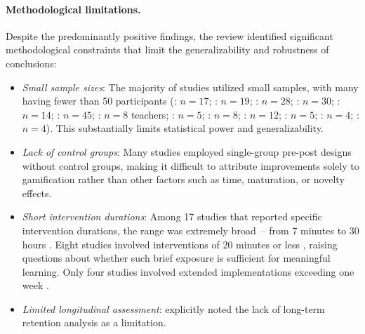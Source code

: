\documentclass[a4paper,fleqn]{cas-sc}
\begin{document}
\paragraph{Methodological limitations.}

Despite the predominantly positive findings, the review identified significant methodological constraints that limit the generalizability and robustness of conclusions:

\begin{itemize}[noitemsep]
 \item \textit{Small sample sizes}: The majority of studies utilized small samples, with many having fewer than 50 participants (\citet{1Barbatsis201159}: $n=17$; \citet{2Mahamarowi2023133}: $n=19$; \citet{5kazanidis2018alpha}: $n=28$; \citet{6Czerwinski2018}: $n=30$; \citet{12Gilbert2019108}: $n=14$; \citet{14Forsyth2023}: $n=45$; \citet{21Ghulamani2017}: $n=8$ teachers; \citet{22Nugroho2020149}: $n=5$; \citet{25Repantis2011502}: $n=8$; \citet{36Scholz2021}: $n=12$; \citet{50Lye2013}: $n=5$; \citet{51Ardito2007}: $n=4$; \citet{73Wolfartsberger2011160}: $n=4$). This substantially limits statistical power and generalizability.
 
 \item \textit{Lack of control groups}: Many studies employed single-group pre-post designs without control groups, making it difficult to attribute improvements solely to gamification rather than other factors such as time, maturation, or novelty effects.
 
 \item \textit{Short intervention durations}: Among 17 studies that reported specific intervention durations, the range was extremely broad~-- from 7 minutes \citep{13Humpire2022} to 30 hours \citep{55Squire2004}. Eight studies involved interventions of 20 minutes or less \citep{2Mahamarowi2023133, 5kazanidis2018alpha, 13Humpire2022, 22Nugroho2020149, 28Chao201734, 36Scholz2021, 69Wong2017150, 70Hou201519}, raising questions about whether such brief exposure is sufficient for meaningful learning. Only four studies involved extended implementations exceeding one week \citep{37Lewis202054, 49Huizenga2007127, 55Squire2004, 79Fernes2024379}.
 
 \item \textit{Limited longitudinal assessment}: \citet{2Mahamarowi2023133, 5kazanidis2018alpha, 13Humpire2022, 22Nugroho2020149, 32Cheng20241718} explicitly noted the lack of long-term retention analysis as a limitation.
 

\end{itemize}
\end{document}
